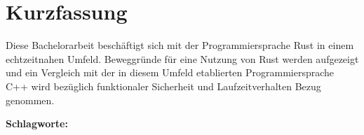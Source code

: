 \chapter*{Kurzfassung}

Diese Bachelorarbeit beschäftigt sich mit der Programmiersprache Rust in einem echtzeitnahen Umfeld.
Beweggründe für eine Nutzung von Rust werden aufgezeigt und ein Vergleich mit der in diesem Umfeld etablierten Programmiersprache C++ wird bezüglich funktionaler Sicherheit und Laufzeitverhalten Bezug genommen.

\textbf{Schlagworte:}